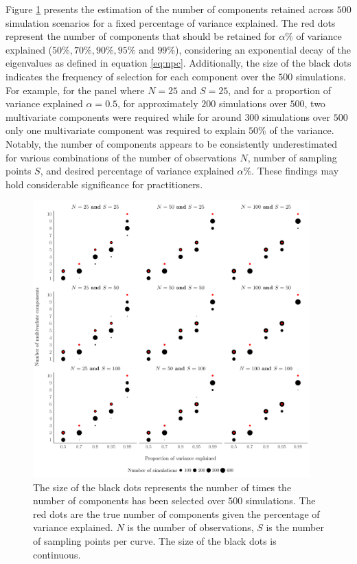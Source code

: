 Figure \ref{fig:npc_estim} presents the estimation of the number of components retained across $500$ simulation scenarios for a fixed percentage of variance explained. The red dots represent the number of components that should be retained for $\alpha\%$ of variance explained ($50\%, 70\%, 90\%, 95\%$ and $99\%$), considering an exponential decay of the eigenvalues as defined in equation \eqref{eq:npc}. Additionally, the size of the black dots indicates the frequency of selection for each component over the $500$ simulations. For example, for the panel where $N = 25$ and $S = 25$, and for a proportion of variance explained $\alpha = 0.5$, for approximately $200$ simulations over $500$, two multivariate components were required while for around $300$ simulations over $500$ only one multivariate component was required to explain $50\%$ of the variance. Notably, the number of components appears to be consistently underestimated for various combinations of the number of observations $N$, number of sampling points $S$, and desired percentage of variance explained $\alpha\%$. These findings may hold considerable significance for practitioners.
\begin{figure}
     \centering
    \includegraphics[width=0.95\textwidth]{figures/npc_estim.pdf}
    \caption{The size of the black dots represents the number of times the number of components has been selected over $500$ simulations. The red dots are the true number of components given the percentage of variance explained. $N$ is the number of observations, $S$ is the number of sampling points per curve. The size of the black dots is continuous.}
    \label{fig:npc_estim}
\end{figure}

